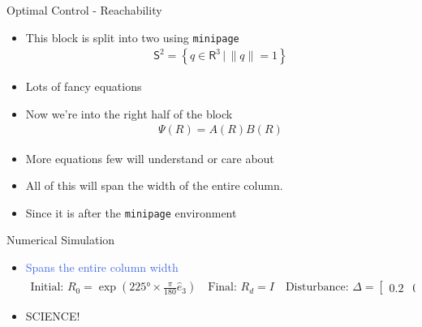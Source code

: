 \documentclass[final, usenames, dvipsnames]{beamer}
\newlength{\twocolwidth}
\def\Emph{\textcolor{RoyalBlue}}
\begin{document}
\begin{frame}[t]
\begin{columns}[T,onlytextwidth]
\begin{column}{\twocolwidth}
\begin{block}{Optimal Control - Reachability} %
	\begin{minipage}{0.5\columnwidth} %
	\begin{itemize}
		\item This block is split into two using \texttt{minipage}
			\begin{align*}
				\mathsf{S}^2 = \left\{q \in \mathsf{R}^3 \,  \vert \, \| q \| = 1 \right\}
			\end{align*}
		\item Lots of fancy equations
	\end{itemize}
	\end{minipage}%
	\begin{minipage}{0.5\columnwidth}%
		\begin{itemize}
			\item Now we're into the right half of the block
				\begin{align*}
					\Psi(R) = A(R) B(R) 
				\end{align*}
			\item More equations few will understand or care about
		\end{itemize}
	\end{minipage}%
	
	\begin{itemize}
		\item All of this will span the width of the entire column.
		\item Since it is after the \texttt{minipage} environment
	\end{itemize}
\end{block} %

\begin{block}{Numerical Simulation} %
	\begin{itemize}
		\item \Emph{Spans the entire column width} 
		\begin{align*}
			\text{Initial: } R_0 =  \exp(\ang{225} \times \frac{\pi}{180} \hat{e}_3) \quad \text{Final: } R_d = I \quad \text{Disturbance: } \Delta = \begin{bmatrix} 0.2 & 0.2 & 0.2 \end{bmatrix}^T
		\end{align*}
		\item SCIENCE!
	\end{itemize}
\end{block} %
\end{column}



\end{columns}
\end{frame}
\end{document}
